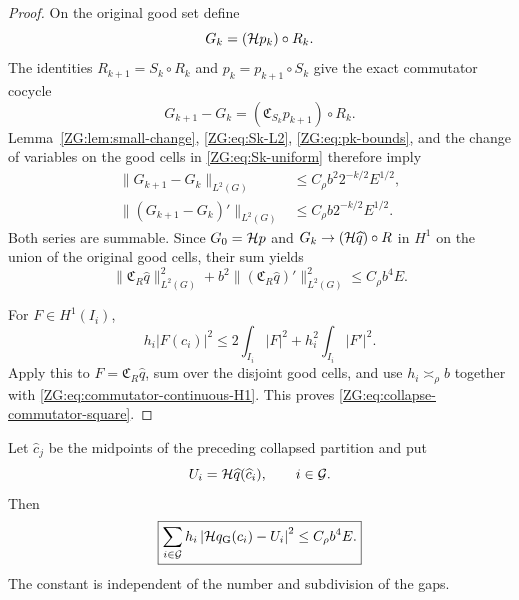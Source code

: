 \begin{proof}
On the original good set define
\[
 G_k=(\mathcal H p_k)\circ R_k.
\]
The identities $R_{k+1}=S_k\circ R_k$ and
$p_k=p_{k+1}\circ S_k$ give the exact commutator cocycle
\begin{equation}\label{ZG:eq:commutator-cocycle}
 G_{k+1}-G_k=(\mathfrak C_{S_k}p_{k+1})\circ R_k.
\end{equation}
Lemma~\ref{ZG:lem:small-change}, \eqref{ZG:eq:Sk-L2},
\eqref{ZG:eq:pk-bounds}, and the change of variables on the good cells in
\eqref{ZG:eq:Sk-uniform} therefore imply
\begin{align}
 \|G_{k+1}-G_k\|_{L^2(G)}
 &\le C_\rho b^2 2^{-k/2}E^{1/2},
 \label{ZG:eq:Gk-H0}\\
 \|(G_{k+1}-G_k)'\|_{L^2(G)}
 &\le C_\rho b 2^{-k/2}E^{1/2}.
 \label{ZG:eq:Gk-H1}
\end{align}
Both series are summable.  Since $G_0=\mathcal H p$ and
$G_k\to(\mathcal H\widehat q)\circ R$ in $H^1$ on the union of the original
good cells, their sum yields
\begin{equation}\label{ZG:eq:commutator-continuous-H1}
 \|\mathfrak C_R\widehat q\|_{L^2(G)}^2
 +b^2\|(\mathfrak C_R\widehat q)'\|_{L^2(G)}^2
 \le C_\rho b^4E.
\end{equation}

For $F\in H^1(I_i)$,
\[
 h_i|F(c_i)|^2
 \le2\int_{I_i}|F|^2+h_i^2\int_{I_i}|F'|^2.
\]
Apply this to $F=\mathfrak C_R\widehat q$, sum over the disjoint good
cells, and use $h_i\asymp_\rho b$ together with
\eqref{ZG:eq:commutator-continuous-H1}.  This proves
\eqref{ZG:eq:collapse-commutator-square}.
\end{proof}

\begin{lemma}\label{ZG:lem:opening}
Let
$\widehat c_j$ be the midpoints of the preceding collapsed partition and put
\begin{equation}\label{ZG:eq:reference-vector}
 U_i=\mathcal H\widehat q(\widehat c_i),\qquad i\in\mathcal G.
\end{equation}
Then
\begin{equation}\label{ZG:eq:opening-square}
 \boxed{
 \sum_{i\in\mathcal G}h_i
 \left|\mathcal H q_{\rm G}(c_i)-U_i\right|^2
 \le C_\rho b^4E.}
\end{equation}
The constant is independent of the number and subdivision of the gaps.
\end{lemma}

